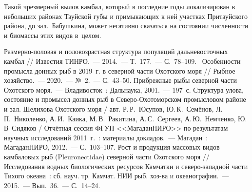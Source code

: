 Такой чрезмерный вылов камбал, который в последние годы локализирован в небольших районах Тауйской губы и примыкающих к ней участках Притауйского района, до зал.~Бабушкина, может негативно сказаться на состоянии численности и биомассы этих видов в~целом.


\begin{thebibliography}{99}

\bibitem{}
 Размерно-половая и половозрастная структура популяций дальневосточных камбал // Известия ТИНРО.~--- 2014.~--- Т.~177.~--- С.~78--109.
\bibitem{}
 Особенности промысла донных рыб в 2019~г. в северной части Охотского моря // Рыбное хозяйство.~--- 2020.~--- №~2.~--- С.~43--50.
\bibitem{}
 Прибрежные рыбы северной части Охотского моря.~--- Владивосток~: Дальнаука, 2001.~--- 197~с.
\bibitem{}
 Структура улова, состояние и промысел донных рыб в Северо-Охотоморском промысловом районе и зал. Шелихова Охотского моря / авт. Р.\,Р.~Юсупов, Ю.\,К.~Семёнов, Л.\,П.~Николенко, А.\,И.~Каика, М.\,В.~Ракитина, А.\,С.~Сергеев, А.\,Ю.~Немченко, Ю.\,В~Сидяков  / Отчётная сессия ФГУП <<МагаданНИРО>> по результатам научных исследований 2011~г.~: материалы докладов.~--- Магадан~: МагаданНИРО, 2012.~--- С.~103--107.
\bibitem{}
 Рост и продукция массовых видов камбаловых рыб (Pleuronectidae) северной части Охотского моря // Исследования водных биологических ресурсов Камчатки и северо-западной части Тихого океана~: сб. науч. тр. Камчат. НИИ рыб. хоз-ва и океанографии.~--- 2015.~--- Вып.~36.~--- С.~14--24.
\end{thebibliography}
